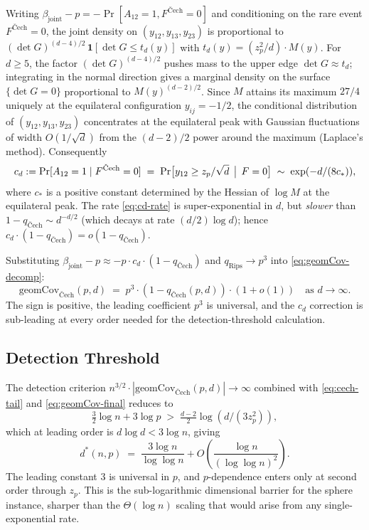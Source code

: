 \documentclass[reqno,12pt]{amsart}
\newcommand{\geomCov}{\mathrm{geomCov}}
\theoremstyle{plain}
\theoremstyle{definition}
\theoremstyle{remark}
\begin{document}
Writing $\beta_{\mathrm{joint}} - p = -\Pr[A_{12} = 1, F^{\text{\v{C}ech}} = 0]$
and conditioning on the rare event $F^{\text{\v{C}ech}} = 0$, the joint density
on $(y_{12}, y_{13}, y_{23})$ is proportional to
$(\det G)^{(d-4)/2} \, \mathbf{1}[\det G \le t_d(y)]$
with $t_d(y) = (z_p^2/d) \cdot M(y)$.
For $d \ge 5$, the factor $(\det G)^{(d-4)/2}$ pushes mass to the upper edge
$\det G \approx t_d$; integrating in the normal direction gives a marginal density
on the surface $\{\det G = 0\}$ proportional to $M(y)^{(d-2)/2}$.
Since $M$ attains its maximum $27/4$ uniquely at the equilateral configuration
$y_{ij} = -1/2$, the conditional distribution of $(y_{12}, y_{13}, y_{23})$
concentrates at the equilateral peak with Gaussian fluctuations of width
$O(1/\sqrt{d})$ from the $(d-2)/2$ power around the maximum (Laplace's method).
Consequently
\begin{equation}\label{eq:cd-rate}
  c_d := \Pr[A_{12} = 1 \mid F^{\text{\v{C}ech}} = 0]
  \;=\; \Pr\bigl[y_{12} \ge z_p / \sqrt{d} \,\bigm|\, F = 0\bigr]
  \;\sim\; \exp(-d/(8 c_*)),
\end{equation}
where $c_*$ is a positive constant determined by the Hessian of $\log M$ at the
equilateral peak. The rate \eqref{eq:cd-rate} is super-exponential in $d$, but
\emph{slower} than $1 - q_{\text{\v{C}ech}} \sim d^{-d/2}$ (which decays at rate
$(d/2) \log d$); hence $c_d \cdot (1 - q_{\text{\v{C}ech}}) = o(1 - q_{\text{\v{C}ech}})$.

Substituting $\beta_{\mathrm{joint}} - p \approx -p \cdot c_d \cdot
(1 - q_{\text{\v{C}ech}})$ and $q_{\text{Rips}} \to p^3$ into \eqref{eq:geomCov-decomp}:
\begin{equation}\label{eq:geomCov-final}
  \boxed{\;\geomCov_{\text{\v{C}ech}}(p, d)
  \;=\; p^3 \cdot (1 - q_{\text{\v{C}ech}}(p, d)) \cdot (1 + o(1))
  \quad \text{as } d \to \infty.\;}
\end{equation}
The sign is positive, the leading coefficient $p^3$ is universal, and the $c_d$
correction is sub-leading at every order needed for the detection-threshold
calculation.

\subsection{Detection Threshold}\label{app:wishart-threshold}

The detection criterion $n^{3/2} \cdot |\geomCov_{\text{\v{C}ech}}(p, d)| \to \infty$
combined with \eqref{eq:cech-tail} and \eqref{eq:geomCov-final} reduces to
\[
  \tfrac{3}{2} \log n + 3 \log p \;>\; \tfrac{d-2}{2} \log(d / (3 z_p^2)),
\]
which at leading order is $d \log d < 3 \log n$, giving
\begin{equation}\label{eq:dstar-final}
  \boxed{\;d^*(n, p)
  \;=\; \frac{3 \log n}{\log\log n}
    + O\!\left(\frac{\log n}{(\log\log n)^2}\right).\;}
\end{equation}
The leading constant $3$ is universal in $p$, and $p$-dependence enters only at
second order through $z_p$. This is the sub-logarithmic dimensional barrier for
the sphere instance, sharper than the $\Theta(\log n)$ scaling that would arise
from any single-exponential rate.
\end{document}
